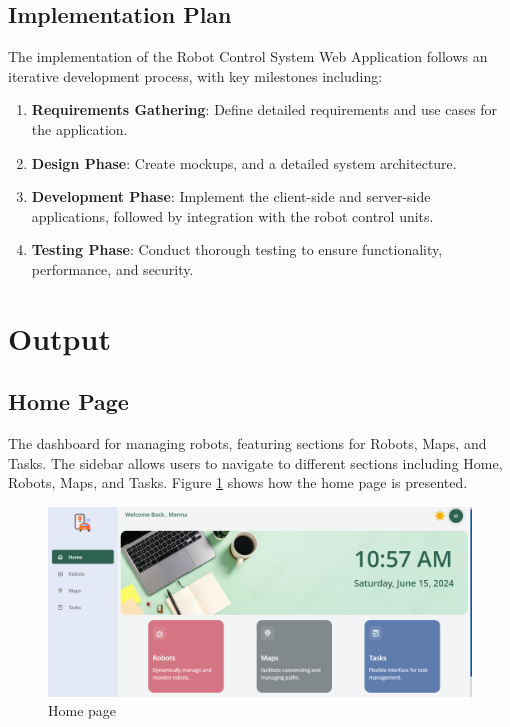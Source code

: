 \subsection{Implementation Plan}
The implementation of the Robot Control System Web Application follows an iterative development process, with key milestones including:
\begin{enumerate}
    \item \textbf{Requirements Gathering}: Define detailed requirements and use cases for the application.
    \item \textbf{Design Phase}: Create mockups, and a detailed system architecture.
    \item \textbf{Development Phase}: Implement the client-side and server-side applications, followed by integration with the robot control units.
    \item \textbf{Testing Phase}: Conduct thorough testing to ensure functionality, performance, and security.

\end{enumerate}



\section{Output} %
\subsection{Home Page}
The dashboard for managing robots, featuring sections for Robots, Maps, and Tasks. The sidebar allows users to navigate to different sections including Home, Robots, Maps, and Tasks. Figure \ref{fig:homePage} shows how the home page is presented.

\begin{figure}[h!]
    \centering
    \includegraphics[scale=0.35]{Figures/WebApp/HomePage.png}
    \caption{Home page}
    \label{fig:homePage}
\end{figure}
\newpage
